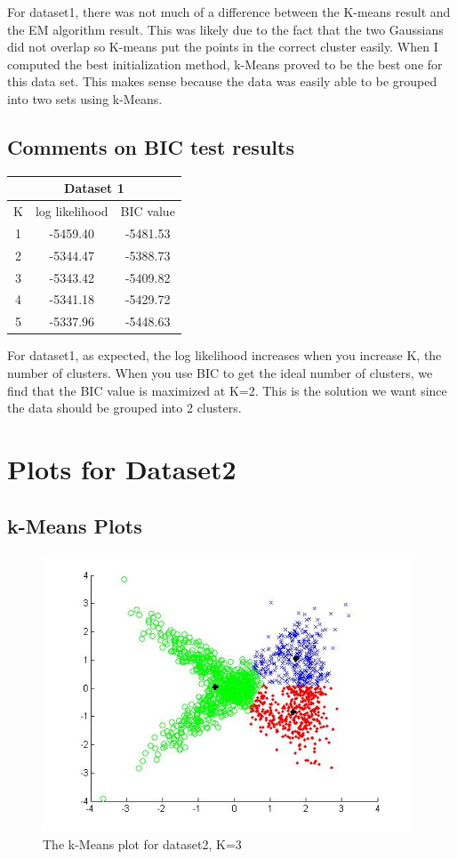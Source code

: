 \documentclass[11pt,psfig]{article}
\begin{document}
For dataset1, there was not much of a difference between the K-means result and the EM algorithm result. This was likely due to the fact that the two Gaussians did not overlap so K-means put the points in the correct cluster easily. When I computed the best initialization method, k-Means proved to be the best one for this data set. This makes sense because the data was easily able to be grouped into two sets using k-Means. 

\subsection{Comments on BIC test results}

\begin{table}[H]
  \centering
  \begin{tabular}{|c|c|c|}
    \hline
    \multicolumn{3}{|c|}{Dataset 1} \\\hline
    K & log likelihood & BIC value \\\hline
    1 & -5459.40 & -5481.53 \\
		2 & -5344.47 & -5388.73 \\
		3 & -5343.42 & -5409.82 \\
		4 & -5341.18 & -5429.72 \\
    5 & -5337.96 & -5448.63 \\\hline
  \end{tabular}
\end{table}

For dataset1, as expected, the log likelihood increases when you increase K, the number of clusters. When you use BIC to get the ideal number of clusters, we find that the BIC value is maximized at K=2. This is the solution we want since the data should be grouped into 2 clusters. 

\section{Plots for Dataset2}

\subsection{k-Means Plots}

\begin{figure}[H]
\centering
\includegraphics[height=3.25in]{dataset2_kMeansPlot.jpg}
\caption{The k-Means plot for dataset2, K=3}
\end{figure}
\end{document}
